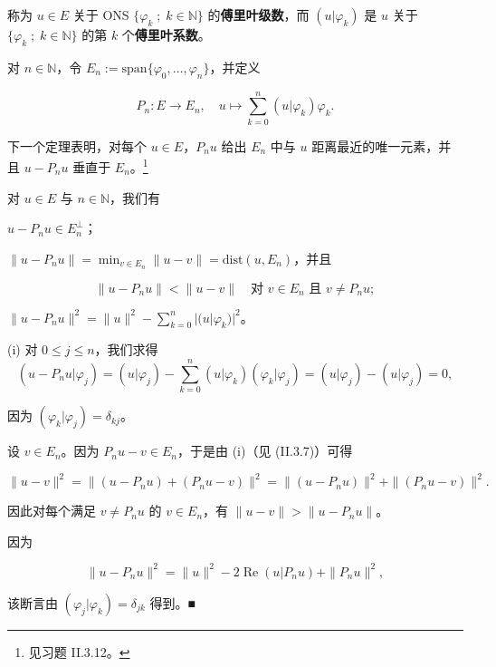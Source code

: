 称为 $ u \in E $ 关于 ONS $ \{ \varphi_{k} \;;\; k \in \mathbb{N} \} $ 的\textbf{傅里叶级数}，而 $ (u|\varphi_{k}) $ 是 $ u $ 关于 $ \{ \varphi_{k} \;;\; k \in \mathbb{N} \} $ 的第 $ k $ 个\textbf{傅里叶系数}。

对 $ n \in \mathbb{N} $，令 $ E_{n} := \mathrm{span}\{\varphi_{0}, \ldots, \varphi_{n}\} $，并定义

\[
P_{n} : E \to E_{n} , \quad u \mapsto \sum_{k=0}^{n}(u|\varphi_{k})\varphi_{k} .
\]

下一个定理表明，对每个 $ u \in E $，$ P_{n}u $ 给出 $ E_{n} $ 中与 $ u $ 距离最近的唯一元素，并且 $ u - P_{n}u $ 垂直于 $ E_{n} $。\footnote{见习题 II.3.12。}


\begin{proposition}

对 $ u \in E $ 与 $ n \in \mathbb{N} $，我们有

\begin{subitems}
\item

$ u - P_{n}u \in E_{n}^{\perp} $；

\item

$ \|u - P_{n}u\| = \min_{v \in E_{n}}\|u - v\| = \mathrm{dist}(u, E_{n}) $，并且

\[
\|u - P_{n}u\| < \|u - v\| \quad \text{对 } v \in E_{n} \text{ 且 } v \ne P_{n}u ;
\]
\item

$ \|u - P_{n}u\|^{2} = \|u\|^{2} - \sum_{k=0}^{n}|(u|\varphi_{k})|^{2} $。

\proofhead
(i) 对 $ 0 \le j \le n $，我们求得
\[
(u - P_{n}u|\varphi_{j}) = (u|\varphi_{j}) - \sum_{k=0}^{n}(u|\varphi_{k})(\varphi_{k}|\varphi_{j}) = (u|\varphi_{j}) - (u|\varphi_{j}) = 0 ,
\]

因为 $ (\varphi_{k}|\varphi_{j}) = \delta_{kj} $。

\end{subitems}

\begin{subitems}
\item[（ii）]

设 $ v \in E_{n} $。因为 $ P_{n}u - v \in E_{n} $，于是由 (i)（见 (II.3.7)）可得

\[
\|u - v\|^{2} = \|(u - P_{n}u) + (P_{n}u - v)\|^{2} = \|(u - P_{n}u)\|^{2} + \|(P_{n}u - v)\|^{2} .
\]

因此对每个满足 $ v \ne P_{n}u $ 的 $ v \in E_{n} $，有 $ \|u - v\| > \|u - P_{n}u\| $。

\item[（iii）]

因为

\[
\|u - P_{n}u\|^{2} = \|u\|^{2} - 2\mathop{\mathrm{Re}}(u|P_{n}u) + \|P_{n}u\|^{2} ,
\]

该断言由 $ (\varphi_{j}|\varphi_{k}) = \delta_{jk} $ 得到。\nobreak\hspace{0.35em}■

\end{subitems}

\end{proposition}

